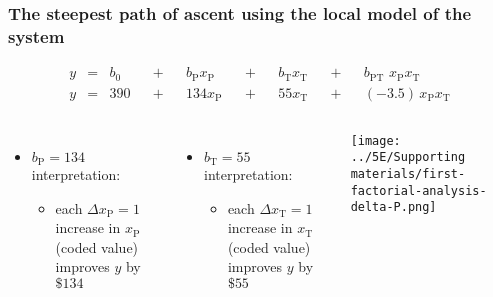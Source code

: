 \begin{frame}\frametitle{The steepest {\color{myOrange}path of ascent} using the local model of the system}

	\begin{exampleblock}{}
		\begin{align*} 
			y &=& b_0 &&+&& b_\text{P} x_\text{P} &&+&& b_\text{T} x_\text{T} &&+&& b_\text{PT}\,\,x_\text{P}x_\text{T} \\
			y &=& 390 &&+&& 134 x_\text{P}        &&+&& 55 x_\text{T}         &&+&& (-3.5)\,x_\text{P}x_\text{T} 
		\end{align*}		
	\end{exampleblock}
	
	\begin{columns}[c]
			\begin{itemize}
				\item	$b_\text{P} =134$ interpretation:
				\begin{itemize}
					\item	each $\Delta x_\text{P} = 1$ increase in $x_\text{P}$ (coded value) improves $y$ by $\$134$
				\end{itemize}
			\end{itemize}
			\pause
			\begin{itemize}
				\item	$b_\text{T} = 55$ interpretation:
				\begin{itemize}
					\item	each $\Delta x_\text{T} = 1$ increase in $x_\text{T}$ (coded value)  improves $y$ by $\$55$
				\end{itemize}
			\end{itemize}
			\centerline{\texttt{[image: ../5E/Supporting materials/first-factorial-analysis-delta-P.png]}}
	\end{columns}
\end{frame}

